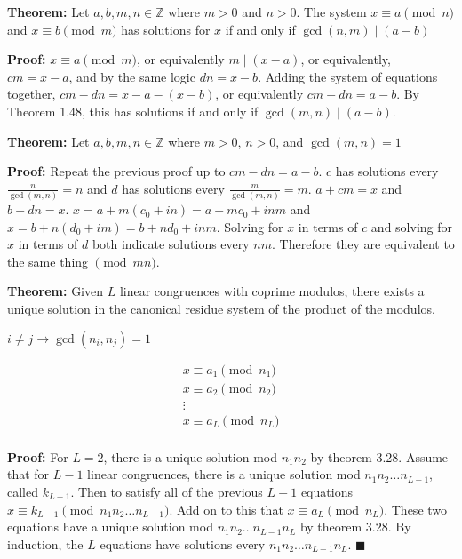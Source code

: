 \item \textbf{Theorem:} Let \(a, b, m, n \in \mathbb Z\) where \(m > 0\) and \(n > 0\). The system \(x \equiv a \pmod n\) and \(x \equiv b \pmod m\) has solutions for \(x\) if and only if \(\gcd(n, m) \mid (a - b)\)

\textbf{Proof:} \(x \equiv a \pmod m\), or equivalently \(m \mid (x-a)\), or equivalently, \(cm = x - a\), and by the same logic \(dn = x - b\). Adding the system of equations together, \(cm - dn = x - a - (x - b)\), or equivalently \(cm - dn = a - b\). By Theorem 1.48, this has solutions if and only if \(\gcd(m, n) \mid (a - b)\).

\item \textbf{Theorem:} Let \(a, b, m, n \in \mathbb Z\) where \(m > 0\), \(n > 0\), and \(\gcd(m, n) = 1\)

\textbf{Proof:} Repeat the previous proof up to \(cm - dn = a - b\).  \(c\) has solutions every \(\frac{n}{\gcd(m, n)} = n\) and \(d\) has solutions every \(\frac{m}{\gcd(m, n)} = m\). \(a + cm = x\) and \(b + dn = x\). \(x = a + m(c_0 + in) = a + m c_0 + inm\) and \(x = b + n(d_0 + im) = b + nd_0 + inm\). Solving for \(x\) in terms of \(c\) and solving for \(x\) in terms of \(d\) both indicate solutions every \(nm\). Therefore they are equivalent to the same thing \(\pmod{mn}\).

\item \textbf{Theorem:} Given \(L\) linear congruences with coprime modulos, there exists a unique solution in the canonical residue system of the product of the modulos.

\(i \neq j \rightarrow \gcd(n_i, n_j) = 1\)

\[
\begin{array}{l}
x \equiv a_1 \pmod{n_1} \\
x \equiv a_2 \pmod{n_2} \\
\vdots \\
x \equiv a_L \pmod{n_L} \\
\end{array}
\]


\textbf{Proof:} For \(L = 2\), there is a unique solution mod \(n_1 n_2\) by theorem 3.28. Assume that for \(L-1\) linear congruences, there is a unique solution mod \(n_1 n_2 \dots n_{L-1}\), called \(k_{L-1}\). Then to satisfy all of the previous \(L-1\) equations \(x \equiv k_{L-1} \pmod {n_1 n_2 \dots n_{L-1}}\). Add on to this that \(x \equiv a_L \pmod {n_L}\). These two equations have a unique solution mod \(n_1 n_2 \dots n_{L-1} n_L\) by theorem 3.28. By induction, the \(L\) equations have solutions every \(n_1 n_2 \dots n_{L-1} n_L\). {\tiny \(\blacksquare\)}


